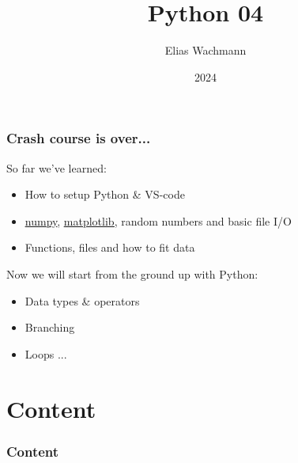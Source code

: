 \documentclass{beamer}
\title[]
{Python 04}
\author[E.~Wachmann]{\scriptsize Elias Wachmann
}
\date{2024} %
\institute[Institute of Theoretical and Computational Physics]
{
}
\newcommand{\hrefu}[2]{\underline{\href{#1}{#2}}}
\begin{document}
\titleframe


\begin{frame}
  \frametitle{Crash course is over...}
  So far we've learned: 
  \begin{itemize}
    \item How to setup Python \& VS-code
    \item \hrefu{https://numpy.org/}{numpy}, \hrefu{https://matplotlib.org/}{matplotlib}, random numbers and basic file I/O
    \item Functions, files and how to fit data
  \end{itemize}
  \vspace{5mm}
  Now we will start from the ground up with Python: 
  \begin{itemize}
    \item Data types \& operators
    \item Branching
    \item Loops ...
  \end{itemize}
\end{frame}

\section*{Content}

\begin{frame}
\frametitle{Content}
  \tableofcontents
\end{frame}
\end{document}
